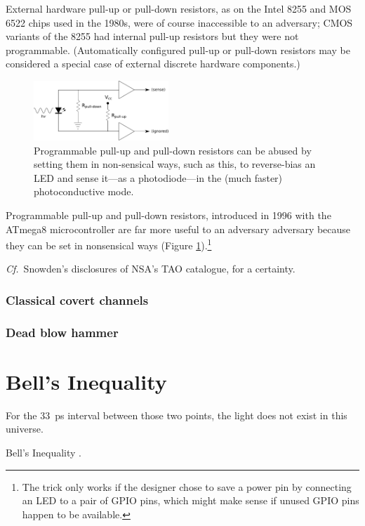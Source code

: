 \documentclass[a4paper,twoside,oldfontcommands]{memoir}
\begin{document}
External hardware pull-up or pull-down resistors, as on the Intel 8255 and MOS
6522 chips used in the 1980s, were of course inaccessible to an adversary; CMOS
variants of the 8255 had internal pull-up resistors but they were not
programmable. (Automatically configured pull-up or pull-down resistors may be
considered a special case of external discrete hardware components.)
\begin{figure}[ht]
  \centering
  \includegraphics[width=2in]{nonsensical.pdf}
  \caption{Programmable pull-up and pull-down resistors can be abused by
    setting them in non-sensical ways, such as this, to reverse-bias an LED
    and sense it---as a photodiode---in the (much faster) photoconductive
    mode.}
  \label{figure:nonsensical}
\end{figure}
Programmable pull-up and pull-down resistors, introduced in 1996 with the
ATmega8 microcontroller \cite{Atmel2013} are far more useful to an adversary
adversary because they can be set in nonsensical ways (Figure
\ref{figure:nonsensical}).\footnote{The trick only works if the designer chose
to save a power pin by connecting an LED to a pair of GPIO pins, which might
make sense if unused GPIO pins happen to be available.}

\emph{Cf.}\ Snowden's disclosures of NSA's TAO catalogue, for a certainty.
\subsubsection{Classical covert channels}
\subsubsection{Dead blow hammer}

\section{Bell's Inequality}
For the \SI{33}{\pico\second} interval between those two points, the light does
not exist in this universe.

Bell's Inequality \cite{Bell1964}.


\end{document}
